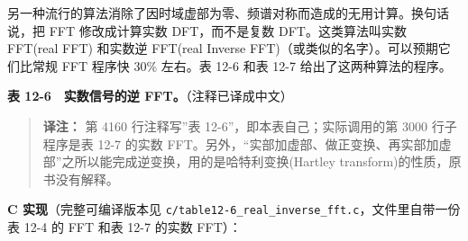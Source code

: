 另一种流行的算法消除了因时域虚部为零、频谱对称而造成的无用计算。换句话说，把
FFT 修改成计算实数 DFT，而不是复数 DFT。这类算法叫实数 FFT(real FFT)
和实数逆 FFT(real Inverse FFT)（或类似的名字）。可以预期它们比常规 FFT
程序快 30\% 左右。表 12-6 和表 12-7 给出了这两种算法的程序。

\textbf{表 12-6　实数信号的逆 FFT。}（注释已译成中文）

\begin{Shaded}
\begin{Highlighting}[]
\NormalTok{4050 \textquotesingle{}}
\NormalTok{4060 \textquotesingle{}}
\NormalTok{4110 \textquotesingle{}}
\NormalTok{4150 \textquotesingle{}}
\NormalTok{4170 \textquotesingle{}}
\NormalTok{4220 \textquotesingle{}}
\end{Highlighting}
\end{Shaded}

\begin{quote}
\textbf{译注：} 第 4160 行注释写''表 12-6''，即本表自己；实际调用的第
3000 行子程序是表 12-7 的实数
FFT。另外，``实部加虚部、做正变换、再实部加虚部''之所以能完成逆变换，用的是哈特利变换(Hartley
transform)的性质，原书没有解释。
\end{quote}

\textbf{C 实现}（完整可编译版本见
\texttt{c/table12-6\_real\_inverse\_fft.c}，文件里自带一份表 12-4 的 FFT
和表 12-7 的实数 FFT）：

